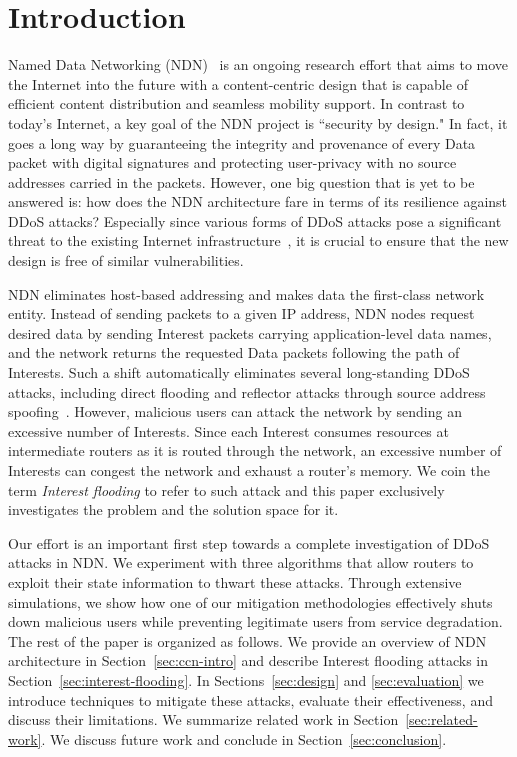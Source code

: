 \section{Introduction}
\label{sec:intro}

Named Data Networking (NDN)~\cite{ndn-conext, ndn-tr} is an ongoing research effort that aims to move the Internet into the future with a content-centric design that is capable of efficient content distribution and seamless mobility support. In contrast to today's Internet, a key goal of the NDN project is ``security by design." In fact, it goes a long way by guaranteeing the integrity and provenance of every Data packet with digital signatures and protecting user-privacy with no source addresses carried in the packets. However, one big question that is yet to be answered is: how does the NDN architecture fare in terms of its resilience against DDoS attacks? Especially since various forms of DDoS attacks pose a significant threat to the existing Internet infrastructure~\cite{arbor-report}, it is crucial to ensure that the new design is free of similar vulnerabilities.

NDN eliminates host-based addressing and makes data the first-class network entity. Instead of sending packets to a given IP address, NDN nodes request desired data by sending Interest packets carrying application-level data names, and the network returns the requested Data packets following the path of Interests. 
Such a shift automatically eliminates several long-standing DDoS attacks, including direct flooding and reflector attacks through source address spoofing~\cite{mirkovic2004taxonomy}.
%
However, malicious users can attack the network by sending an excessive number of Interests. 
Since each Interest consumes resources at intermediate routers as it is routed through the network, an excessive number of Interests can congest the network and exhaust a router's memory. 
We coin the term {\it Interest flooding} to refer to such attack and
this paper exclusively investigates the problem and the solution space for it. 

Our effort is an important first step towards a complete investigation of DDoS attacks in NDN. We experiment with three algorithms that allow routers to exploit their state information to thwart these attacks. Through extensive simulations, we show how one of our mitigation methodologies effectively shuts down malicious users while preventing legitimate users from service degradation. 
The rest of the paper is organized as follows. We provide an overview of NDN architecture in Section~\ref{sec:ccn-intro} and describe Interest flooding attacks in Section~\ref{sec:interest-flooding}. In Sections~\ref{sec:design} and \ref{sec:evaluation} we introduce techniques to mitigate these attacks, evaluate their effectiveness, and discuss their limitations. We summarize related work in Section~\ref{sec:related-work}. We discuss future work and conclude in Section~\ref{sec:conclusion}. 

